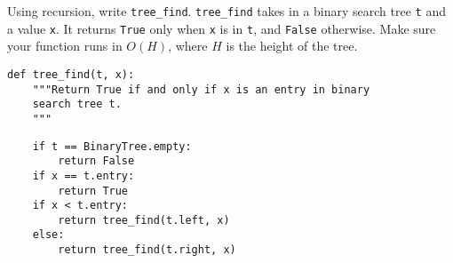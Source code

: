 \question Using recursion, write \texttt{tree\_find}. \texttt{tree\_find} takes in a
binary search tree \texttt{t} and a value \texttt{x}. It returns \texttt{True}
only when \texttt{x} is in \texttt{t}, and \texttt{False} otherwise. Make sure
your function runs in $O(H)$, where $H$ is the height of the tree. \\

\begin{lstlisting}
def tree_find(t, x):
    """Return True if and only if x is an entry in binary
    search tree t.
    """
\end{lstlisting}
\begin{solution}[2.2in]
\begin{lstlisting}
    if t == BinaryTree.empty:
        return False
    if x == t.entry:
        return True
    if x < t.entry:
        return tree_find(t.left, x)
    else:
        return tree_find(t.right, x)
\end{lstlisting}
\end{solution}
